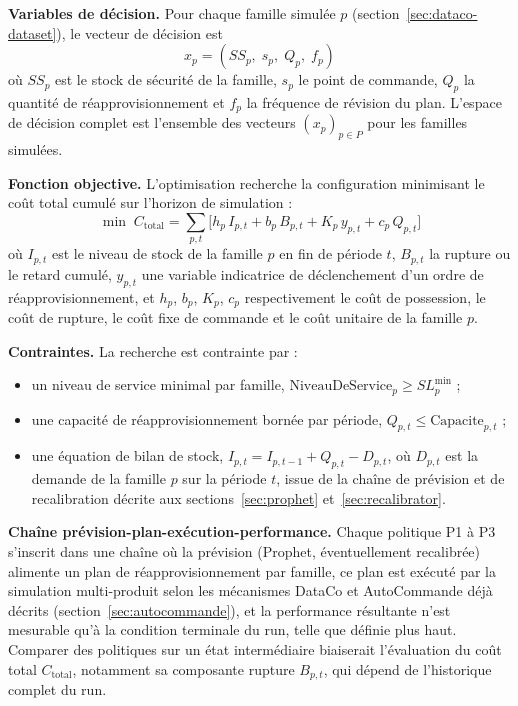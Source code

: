 \documentclass[11pt,a4paper]{article}
\begin{document}
\textbf{Variables de décision.} Pour chaque famille simulée \(p\) (section~\ref{sec:dataco-dataset}), le vecteur de décision est
\[
x_p = (SS_p,\; s_p,\; Q_p,\; f_p)
\]
où \(SS_p\) est le stock de sécurité de la famille, \(s_p\) le point de commande, \(Q_p\) la quantité de réapprovisionnement et \(f_p\) la fréquence de révision du plan. L'espace de décision complet est l'ensemble des vecteurs \((x_p)_{p \in P}\) pour les familles simulées.

\textbf{Fonction objective.} L'optimisation recherche la configuration minimisant le coût total cumulé sur l'horizon de simulation :
\[
\min\; C_{\text{total}} = \sum_{p,t} \Big[ h_p\, I_{p,t} + b_p\, B_{p,t} + K_p\, y_{p,t} + c_p\, Q_{p,t} \Big]
\]
où \(I_{p,t}\) est le niveau de stock de la famille \(p\) en fin de période \(t\), \(B_{p,t}\) la rupture ou le retard cumulé, \(y_{p,t}\) une variable indicatrice de déclenchement d'un ordre de réapprovisionnement, et \(h_p\), \(b_p\), \(K_p\), \(c_p\) respectivement le coût de possession, le coût de rupture, le coût fixe de commande et le coût unitaire de la famille \(p\).

\textbf{Contraintes.} La recherche est contrainte par :
\begin{itemize}[leftmargin=1.5em]
  \item un niveau de service minimal par famille, \(\text{NiveauDeService}_p \geq SL_p^{\min}\) ;
  \item une capacité de réapprovisionnement bornée par période, \(Q_{p,t} \leq \text{Capacite}_{p,t}\) ;
  \item une équation de bilan de stock, \(I_{p,t} = I_{p,t-1} + Q_{p,t} - D_{p,t}\), où \(D_{p,t}\) est la demande de la famille \(p\) sur la période \(t\), issue de la chaîne de prévision et de recalibration décrite aux sections~\ref{sec:prophet} et~\ref{sec:recalibrator}.
\end{itemize}

\textbf{Chaîne prévision-plan-exécution-performance.} Chaque politique P1 à P3 s'inscrit dans une chaîne où la prévision (Prophet, éventuellement recalibrée) alimente un plan de réapprovisionnement par famille, ce plan est exécuté par la simulation multi-produit selon les mécanismes DataCo et AutoCommande déjà décrits (section~\ref{sec:autocommande}), et la performance résultante n'est mesurable qu'à la condition terminale du run, telle que définie plus haut. Comparer des politiques sur un état intermédiaire biaiserait l'évaluation du coût total \(C_{\text{total}}\), notamment sa composante rupture \(B_{p,t}\), qui dépend de l'historique complet du run.
\end{document}
